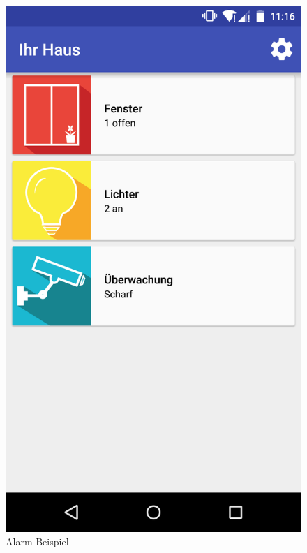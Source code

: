 \begin{figure}[htbp]
\begin{minipage}{0.32\textwidth}
		\includegraphics[scale=0.12]{appendix/img/AppScreenshots/Screenshot7}
		\caption{Alarm Beispiel}
		\label{fig:screenshot_7}
	\end{minipage}
\end{figure}


